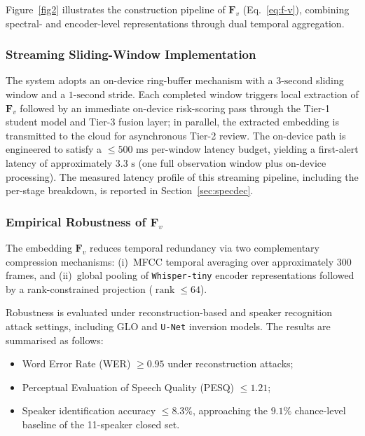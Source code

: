 \documentclass[a4paper,fleqn]{cas-sc}
\begin{document}
Figure~\ref{fig2} illustrates the construction pipeline of $\bm{F}_v$ (Eq.~\eqref{eq:f-v}), combining spectral- and encoder-level representations through dual temporal aggregation.

\subsubsection{Streaming Sliding-Window Implementation}\label{sec:streaming}

The system adopts an on-device ring-buffer mechanism with a $3\text{-second}$ sliding window and a $1\text{-second}$ stride. Each completed window triggers local extraction of $\bm{F}_v$ followed by an immediate on-device risk-scoring pass through the Tier-1 student model and Tier-3 fusion layer; in parallel, the extracted embedding is transmitted to the cloud for asynchronous Tier-2 review. The on-device path is engineered to satisfy a $\le 500\text{~ms}$ per-window latency budget, yielding a first-alert latency of approximately $3.3\text{~s}$ (one full observation window plus on-device processing). The measured latency profile of this streaming pipeline, including the per-stage breakdown, is reported in Section~\ref{sec:specdec}.

\subsubsection{Empirical Robustness of $\bm{F}_v$}

The embedding $\bm{F}_v$ reduces temporal redundancy via two complementary compression mechanisms: (i)~MFCC temporal averaging over approximately $300$ frames, and (ii)~global pooling of \texttt{Whisper-tiny} encoder representations followed by a rank-constrained projection ($\operatorname{rank} \le 64$).

Robustness is evaluated under reconstruction-based and speaker recognition attack settings, including GLO and \texttt{U-Net} inversion models. The results are summarised as follows:
\begin{itemize}
    \item Word Error Rate (WER) $\ge 0.95$ under reconstruction attacks;
    \item Perceptual Evaluation of Speech Quality (PESQ) $\le 1.21$;
    \item Speaker identification accuracy $\le 8.3\%$, approaching the $9.1\%$ chance-level baseline of the 11-speaker closed set.
\end{itemize}
\end{document}
